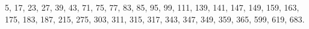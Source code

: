 5, 17, 23, 27, 39, 43, 71, 75, 77, 83, 85, 95, 99, 111, 139, 141, 147, 149, 159, 163, 175, 183, 187, 215, 275, 303, 311, 315, 317, 343, 347, 349, 359, 365, 599, 619, 683.
